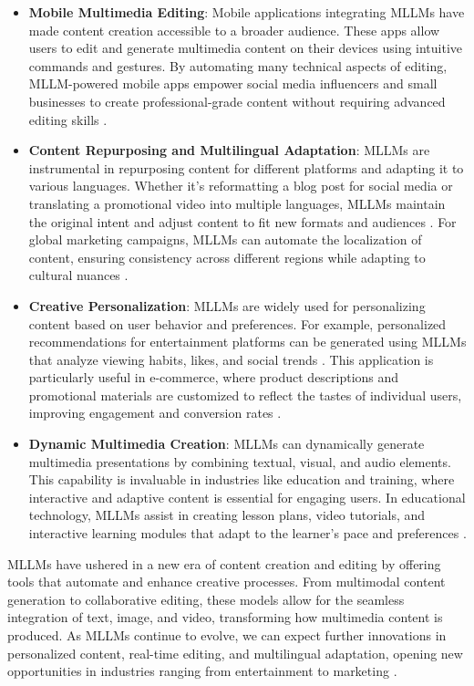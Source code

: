 \documentclass{article}
\begin{document}
\begin{itemize}
\item \textbf{Mobile Multimedia Editing}: Mobile applications integrating MLLMs have made content creation accessible to a broader audience. These apps allow users to edit and generate multimedia content on their devices using intuitive commands and gestures. By automating many technical aspects of editing, MLLM-powered mobile apps empower social media influencers and small businesses to create professional-grade content without requiring advanced editing skills \cite{vs2024jokela}.

\item \textbf{Content Repurposing and Multilingual Adaptation}: MLLMs are instrumental in repurposing content for different platforms and adapting it to various languages. Whether it's reformatting a blog post for social media or translating a promotional video into multiple languages, MLLMs maintain the original intent and adjust content to fit new formats and audiences \cite{vs2024obrenovic}. For global marketing campaigns, MLLMs can automate the localization of content, ensuring consistency across different regions while adapting to cultural nuances \cite{vs2024bateman}.

\item \textbf{Creative Personalization}: MLLMs are widely used for personalizing content based on user behavior and preferences. For example, personalized recommendations for entertainment platforms can be generated using MLLMs that analyze viewing habits, likes, and social trends \cite{vs2024bateman}. This application is particularly useful in e-commerce, where product descriptions and promotional materials are customized to reflect the tastes of individual users, improving engagement and conversion rates \cite{vs2024schmidt}.

\item \textbf{Dynamic Multimedia Creation}: MLLMs can dynamically generate multimedia presentations by combining textual, visual, and audio elements. This capability is invaluable in industries like education and training, where interactive and adaptive content is essential for engaging users. In educational technology, MLLMs assist in creating lesson plans, video tutorials, and interactive learning modules that adapt to the learner's pace and preferences \cite{vs2024anderson}.

\end{itemize}

MLLMs have ushered in a new era of content creation and editing by offering tools that automate and enhance creative processes. From multimodal content generation to collaborative editing, these models allow for the seamless integration of text, image, and video, transforming how multimedia content is produced. As MLLMs continue to evolve, we can expect further innovations in personalized content, real-time editing, and multilingual adaptation, opening new opportunities in industries ranging from entertainment to marketing \cite{vs2024chang,vs2024kubicek}.
\end{document}
